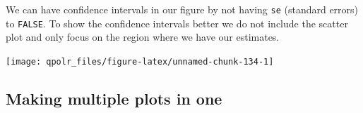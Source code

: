 \documentclass[12pt,oneside]{reedthesis}
\theoremstyle{definition}
\theoremstyle{definition}
\theoremstyle{definition}
\theoremstyle{remark}
\begin{document}
  We can have confidence intervals in our figure by not having \texttt{se}
  (standard errors) to \texttt{FALSE}. To show the confidence intervals
  better we do not include the scatter plot and only focus on the region
  where we have our estimates.
  \begin{Shaded}
  \begin{Highlighting}[]
  \NormalTok{(}\OperatorTok{+}
  \StringTok{  }\NormalTok{(} \NormalTok{(}\NormalTok{, }\NormalTok{)) }\OperatorTok{+}
  \StringTok{  }\NormalTok{() }\OperatorTok{+}\StringTok{ }
  \StringTok{  }\NormalTok{(}
       \NormalTok{,}
       \NormalTok{,}
       
  \NormalTok{  ) }\OperatorTok{+}
  \StringTok{  }\NormalTok{(}\NormalTok{) }\OperatorTok{+}
  \StringTok{  }\NormalTok{(}\NormalTok{) }\OperatorTok{+}
  \StringTok{  }\NormalTok{(}\NormalTok{)}
  \end{Highlighting}
  \end{Shaded}
  \begin{center}\texttt{[image: qpolr\_files/figure-latex/unnamed-chunk-134-1]} \end{center}
  
  \subsection{Making multiple plots in
  one}\label{making-multiple-plots-in-one}
  
\end{document}

